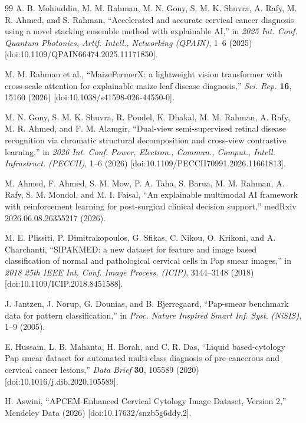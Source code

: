 \documentclass[12pt,letterpaper]{article}
\begin{document}
{\begin{thebibliography}{99}
A. B. Mohiuddin, M. M. Rahman, M. N. Gony, S. M. K. Shuvra, A. Rafy, M. R. Ahmed, and S. Rahman, ``Accelerated and accurate cervical cancer diagnosis using a novel stacking ensemble method with explainable AI,'' in \textit{2025 Int. Conf. Quantum Photonics, Artif. Intell., Networking (QPAIN)}, 1--6 (2025) [doi:10.1109/QPAIN66474.2025.11171850].

M. M. Rahman et al., ``MaizeFormerX: a lightweight vision transformer with cross-scale attention for explainable maize leaf disease diagnosis,'' \textit{Sci. Rep.} \textbf{16}, 15160 (2026) [doi:10.1038/s41598-026-44550-0].

M. N. Gony, S. M. K. Shuvra, R. Poudel, K. Dhakal, M. M. Rahman, A. Rafy, M. R. Ahmed, and F. M. Alamgir, ``Dual-view semi-supervised retinal disease recognition via chromatic structural decomposition and cross-view contrastive learning,'' in \textit{2026 Int. Conf. Power, Electron., Commun., Comput., Intell. Infrastruct. (PECCII)}, 1--6 (2026) [doi:10.1109/PECCII70991.2026.11661813].

M. Ahmed, F. Ahmed, S. M. Mow, P. A. Taha, S. Barua, M. M. Rahman, A. Rafy, S. M. Mondol, and M. I. Faisal, ``An explainable multimodal AI framework with reinforcement learning for post-surgical clinical decision support,'' medRxiv 2026.06.08.26355217 (2026).

M. E. Plissiti, P. Dimitrakopoulos, G. Sfikas, C. Nikou, O. Krikoni, and A. Charchanti, ``SIPAKMED: a new dataset for feature and image based classification of normal and pathological cervical cells in Pap smear images,'' in \textit{2018 25th IEEE Int. Conf. Image Process. (ICIP)}, 3144--3148 (2018) [doi:10.1109/ICIP.2018.8451588].

J. Jantzen, J. Norup, G. Dounias, and B. Bjerregaard, ``Pap-smear benchmark data for pattern classification,'' in \textit{Proc. Nature Inspired Smart Inf. Syst. (NiSIS)}, 1--9 (2005).

E. Hussain, L. B. Mahanta, H. Borah, and C. R. Das, ``Liquid based-cytology Pap smear dataset for automated multi-class diagnosis of pre-cancerous and cervical cancer lesions,'' \textit{Data Brief} \textbf{30}, 105589 (2020) [doi:10.1016/j.dib.2020.105589].

H. Aswini, ``APCEM-Enhanced Cervical Cytology Image Dataset, Version 2,'' Mendeley Data (2026) [doi:10.17632/snzb5g6ddy.2].


\end{thebibliography}}
\end{document}
